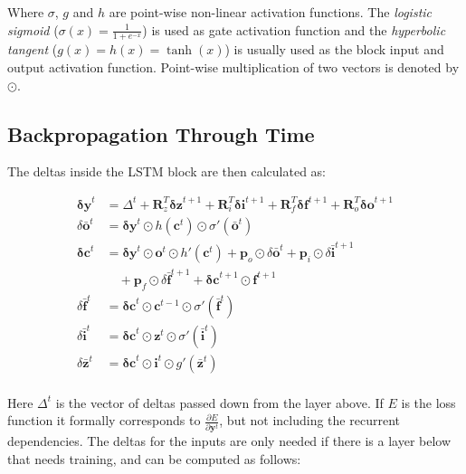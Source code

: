Where $\sigma$, $g$ and $h$ are point-wise non-linear activation functions. The {\it logistic sigmoid} ($\sigma(x) = \frac{1}{1+e^{-x}}$) is used as gate activation function and the {\it hyperbolic tangent} ($g(x) = h(x) = \tanh(x)$) is usually used as the block input and output activation function. Point-wise multiplication of two vectors is denoted by $\odot$.

\subsection{Backpropagation Through Time} The deltas inside the LSTM block are then calculated as:

\begin{align*}
    \mathbf{\delta y}^t &= \Delta^t + \mathbf{R}_z^T \mathbf{\delta z}^{t+1}  +
                                      \mathbf{R}_i^T \mathbf{\delta i}^{t+1}  +
                                      \mathbf{R}_f^T \mathbf{\delta f}^{t+1}  +
                                      \mathbf{R}_o^T \mathbf{\delta o}^{t+1} \\
    \delta \bar{\mathbf{o}}^t &= \mathbf{\delta y}^t \odot h(\mathbf{c}^t) \odot \sigma'(\bar{\mathbf{o}}^t) \\
    \mathbf{\delta c}^t &= \mathbf{\delta y}^t \odot \mathbf{o}^t \odot h'(\mathbf{c}^t) +
                          \mathbf{p}_o \odot \delta \bar{\mathbf{o}}^t +
                          \mathbf{p}_i \odot \delta \bar{\mathbf{i}}^{t+1}\\
                        &\quad+\mathbf{p}_f \odot \delta \bar{\mathbf{f}}^{t+1} +
                          \mathbf{\delta c}^{t+1} \odot \mathbf{f}^{t+1} \\
    \delta \bar{\mathbf{f}}^t &= \mathbf{\delta c}^t \odot \mathbf{c}^{t-1} \odot \sigma'(\bar{\mathbf{f}}^t) \\
    \delta \bar{\mathbf{i}}^t &= \mathbf{\delta c}^t \odot \mathbf{z}^{t} \odot \sigma'(\bar{\mathbf{i}}^t) \\
    \delta \bar{\mathbf{z}}^t &= \mathbf{\delta c}^t \odot \mathbf{i}^{t} \odot g'(\bar{\mathbf{z}}^t) \\
\end{align*}

Here $\Delta^t$ is the vector of deltas passed down from the layer above. If $E$ is the loss function it formally corresponds to $\frac{\partial E}{\partial\mathbf{y}^{t}}$, but not including the recurrent dependencies. The deltas for the inputs are only needed if there is a layer below that needs training, and can be computed as follows:

